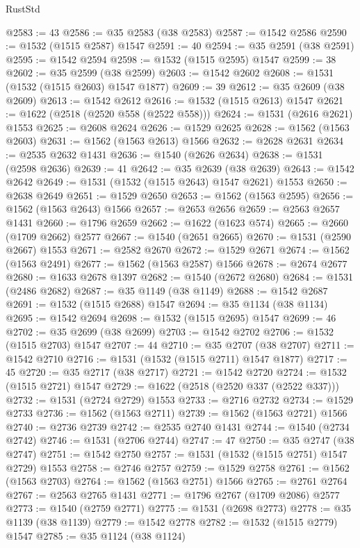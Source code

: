\begin{lexlean}{RustStd}
\begin{coremodule}
{\begin{coremodule}
{{{{{{{{{{{{{{{{{{{{{{{{{{{{{{{{@2583 := 43
@2586 := @35 @2583 (@38 @2583)
@2587 := @1542 @2586
@2590 := @1532 (@1515 @2587) @1547
@2591 := 40
@2594 := @35 @2591 (@38 @2591)
@2595 := @1542 @2594
@2598 := @1532 (@1515 @2595) @1547
@2599 := 38
@2602 := @35 @2599 (@38 @2599)
@2603 := @1542 @2602
@2608 := @1531 (@1532 (@1515 @2603) @1547 @1877)
@2609 := 39
@2612 := @35 @2609 (@38 @2609)
@2613 := @1542 @2612
@2616 := @1532 (@1515 @2613) @1547
@2621 := @1622 (@2518 (@2520 @558 (@2522 @558)))
@2624 := @1531 (@2616 @2621) @1553
@2625 := @2608 @2624
@2626 := @1529 @2625
@2628 := @1562 (@1563 @2603)
@2631 := @1562 (@1563 @2613) @1566
@2632 := @2628 @2631
@2634 := @2535 @2632 @1431
@2636 := @1540 (@2626 @2634)
@2638 := @1531 (@2598 @2636)
@2639 := 41
@2642 := @35 @2639 (@38 @2639)
@2643 := @1542 @2642
@2649 := @1531 (@1532 (@1515 @2643) @1547 @2621) @1553
@2650 := @2638 @2649
@2651 := @1529 @2650
@2653 := @1562 (@1563 @2595)
@2656 := @1562 (@1563 @2643) @1566
@2657 := @2653 @2656
@2659 := @2563 @2657 @1431
@2660 := @1796 @2659
@2662 := @1622 (@1623 @574)
@2665 := @2660 (@1709 @2662) @2577
@2667 := @1540 (@2651 @2665)
@2670 := @1531 (@2590 @2667) @1553
@2671 := @2582 @2670
@2672 := @1529 @2671
@2674 := @1562 (@1563 @2491)
@2677 := @1562 (@1563 @2587) @1566
@2678 := @2674 @2677
@2680 := @1633 @2678 @1397
@2682 := @1540 (@2672 @2680)
@2684 := @1531 (@2486 @2682)
@2687 := @35 @1149 (@38 @1149)
@2688 := @1542 @2687
@2691 := @1532 (@1515 @2688) @1547
@2694 := @35 @1134 (@38 @1134)
@2695 := @1542 @2694
@2698 := @1532 (@1515 @2695) @1547
@2699 := 46
@2702 := @35 @2699 (@38 @2699)
@2703 := @1542 @2702
@2706 := @1532 (@1515 @2703) @1547
@2707 := 44
@2710 := @35 @2707 (@38 @2707)
@2711 := @1542 @2710
@2716 := @1531 (@1532 (@1515 @2711) @1547 @1877)
@2717 := 45
@2720 := @35 @2717 (@38 @2717)
@2721 := @1542 @2720
@2724 := @1532 (@1515 @2721) @1547
@2729 := @1622 (@2518 (@2520 @337 (@2522 @337)))
@2732 := @1531 (@2724 @2729) @1553
@2733 := @2716 @2732
@2734 := @1529 @2733
@2736 := @1562 (@1563 @2711)
@2739 := @1562 (@1563 @2721) @1566
@2740 := @2736 @2739
@2742 := @2535 @2740 @1431
@2744 := @1540 (@2734 @2742)
@2746 := @1531 (@2706 @2744)
@2747 := 47
@2750 := @35 @2747 (@38 @2747)
@2751 := @1542 @2750
@2757 := @1531 (@1532 (@1515 @2751) @1547 @2729) @1553
@2758 := @2746 @2757
@2759 := @1529 @2758
@2761 := @1562 (@1563 @2703)
@2764 := @1562 (@1563 @2751) @1566
@2765 := @2761 @2764
@2767 := @2563 @2765 @1431
@2771 := @1796 @2767 (@1709 @2086) @2577
@2773 := @1540 (@2759 @2771)
@2775 := @1531 (@2698 @2773)
@2778 := @35 @1139 (@38 @1139)
@2779 := @1542 @2778
@2782 := @1532 (@1515 @2779) @1547
@2785 := @35 @1124 (@38 @1124)
}}}}}}}}}}}}}}}}}}}}}}}}}}}}}}}}
\end{coremodule}}
\end{coremodule}
\end{lexlean}
